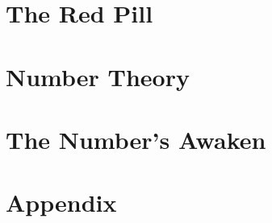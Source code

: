 \documentclass{maaprb}
\begin{document}
\part{The Red Pill}




\part{Number Theory}




\part{The Number's Awaken}


\backmatter
\part{Appendix}





\clearpage
\end{document}

